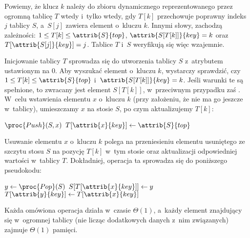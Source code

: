 Powiemy, że klucz $k$ należy do zbioru dynamicznego reprezentowanego przez ogromną tablicę $T$ wtedy i~tylko wtedy, gdy $T[k]$ przechowuje poprawny indeks $j$ tablicy $S$, a~$S[j]$ zawiera element o~kluczu $k$.
Innymi słowy, zachodzą zależności: $1\le T[k]\le\attrib{S}{top}$, $\attrib{S[T[k]]}{key}=k$ oraz $T[\attrib{S[j]}{key}]=j$.
Tablice $T$ i~$S$ weryfikują się więc wzajemnie.

Inicjowanie tablicy $T$ sprowadza się do utworzenia tablicy $S$ z~atrybutem  ustawionym na 0.
Aby wyszukać element o~kluczu $k$, wystarczy sprawdzić, czy $1\le T[k]\le\attrib{S}{top}$ i~$\attrib{S[T[k]]}{key}=k$.
Jeśli warunki te są spełnione, to zwracany jest element $S[T[k]]$, w~przeciwnym przypadku zaś .
W~celu wstawienia elementu $x$ o~kluczu $k$ (przy założeniu, że nie ma go jeszcze w~tablicy), umieszczamy $x$ na stosie $S$, po czym aktualizujemy $T[k]$:
\begin{codebox}
\li	$\proc{Push}(S,x)$
\li	$T[\attrib{x}{key}]\gets\attrib{S}{top}$
\end{codebox}
Usuwanie elementu $x$ o~kluczu $k$ polega na przeniesieniu elementu usuniętego ze szczytu stosu $S$ na pozycję $T[k]$ w~tym stosie oraz aktualizacji odpowiedniej wartości w~tablicy $T$.
Dokładniej, operacja ta sprowadza się do poniższego pseudokodu:
\begin{codebox}
\li	$y\gets\proc{Pop}(S)$
\li	$S[T[\attrib{x}{key}]]\gets y$
\li	$T[\attrib{y}{key}]\gets T[\attrib{x}{key}]$
\end{codebox}

Każda omówiona operacja działa w~czasie $\Theta(1)$, a~każdy element znajdujący się w~ogromnej tablicy (nie licząc dodatkowych danych z~nim związanych) zajmuje $\Theta(1)$ pamięci.
